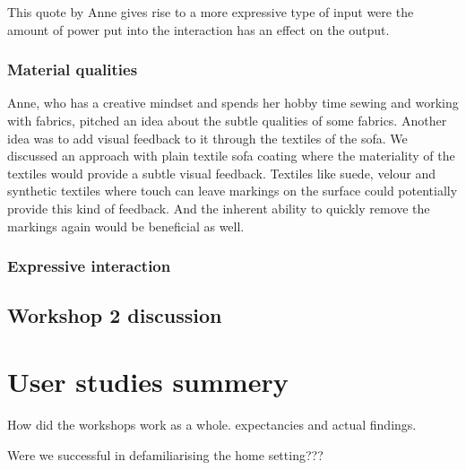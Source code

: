 This quote by Anne gives rise to a more expressive type of input were the amount of power put into the interaction has an effect on the output.


\subsubsection{Material qualities}

Anne, who has a creative mindset and spends her hobby time sewing and working with fabrics, pitched an idea about the subtle qualities of some fabrics.
Another idea was to add visual feedback to it through the textiles of the sofa.
We discussed an approach with plain textile sofa coating where the materiality of the textiles would provide a subtle visual feedback.
Textiles like suede, velour and synthetic textiles where touch can leave markings on the surface could potentially provide this kind of feedback.
And the inherent ability to quickly remove the markings again would be beneficial as well.

\subsubsection{Expressive interaction}

\subsection{Workshop 2 discussion}
\label{ch:workshops:workshop-ii:discussion}



\section{User studies summery}
\label{ch:workshops:discussion}

How did the workshops work as a whole. expectancies and actual findings.

 Were we successful in defamiliarising the home setting???


